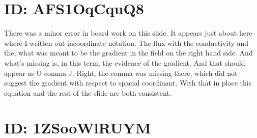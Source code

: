 \documentclass[10pt]{article}
\begin{document}
\section*{ID: AFS1OqCquQ8}
There was a minor error in board work on this slide. It appears just about here where I written out incoordinate notation. The flux with the conductivity and the, what was meant to be the gradient in the field on the right hand side. And what's missing is, in this term, the evidence of the gradient. And that should appear as U comma J. Right, the comma was missing there, which did not suggest the gradient with respect to spacial coordinant. With that in place this equation and the rest of the slide are both consistent.

\section*{ID: 1ZSooWlRUYM}
\end{document}
